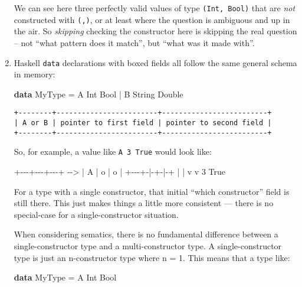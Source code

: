 \documentclass[]{article}
\newenvironment{Shaded}{}{}
\newcommand{\DataTypeTok}[1]{\textcolor[rgb]{0.56,0.13,0.00}{#1}}
\newcommand{\DecValTok}[1]{\textcolor[rgb]{0.25,0.63,0.44}{#1}}
\newcommand{\KeywordTok}[1]{\textcolor[rgb]{0.00,0.44,0.13}{\textbf{#1}}}
\newcommand{\NormalTok}[1]{#1}
\newcommand{\OperatorTok}[1]{\textcolor[rgb]{0.40,0.40,0.40}{#1}}
\newcommand{\OtherTok}[1]{\textcolor[rgb]{0.00,0.44,0.13}{#1}}
\begin{document}
\begin{enumerate}
  We can see here three perfectly valid values of type \texttt{(Int,\ Bool)}
  that are \emph{not} constructed with \texttt{(,)}, or at least where the
  question is ambiguous and up in the air. So \emph{skipping} checking the
  constructor here is skipping the real question -- not ``what pattern does it
  match'', but ``what was it made with''.
\item
  Haskell \texttt{data} declarations with boxed fields all follow the same
  general schema in memory:

\begin{Shaded}
\begin{Highlighting}[]
\KeywordTok{data} \DataTypeTok{MyType} \OtherTok{=} \DataTypeTok{A} \DataTypeTok{Int} \DataTypeTok{Bool}
            \OperatorTok{|} \DataTypeTok{B} \DataTypeTok{String} \DataTypeTok{Double}
\end{Highlighting}
\end{Shaded}

\begin{verbatim}
+--------+------------------------+-------------------------+
| A or B | pointer to first field | pointer to second field |
+--------+------------------------+-------------------------+
\end{verbatim}

  So, for example, a value like \texttt{A\ 3\ True} would look like:

\begin{Shaded}
\begin{Highlighting}[]
    \OperatorTok{+{-}{-}{-}+{-}{-}{-}+{-}{-}{-}+}
\OperatorTok{{-}{-}\textgreater{}} \OperatorTok{|} \DataTypeTok{A} \OperatorTok{|}\NormalTok{ o }\OperatorTok{|}\NormalTok{ o }\OperatorTok{|}
    \OperatorTok{+{-}{-}{-}+{-}|{-}+{-}|{-}+}
      \OperatorTok{|}   \OperatorTok{|}
\NormalTok{      v   v}
      \DecValTok{3}   \DataTypeTok{True}
\end{Highlighting}
\end{Shaded}

  For a type with a single constructor, that initial ``which constructor'' field
  is still there. This just makes things a little more consistent --- there is
  no special-case for a single-constructor situation.

  When considering sematics, there is no fundamental difference between a
  single-constructor type and a multi-constructor type. A single-constructor
  type is just an n-constructor type where n = 1. This means that a type like:

\begin{Shaded}
\begin{Highlighting}[]
\KeywordTok{data} \DataTypeTok{MyType} \OtherTok{=} \DataTypeTok{A} \DataTypeTok{Int} \DataTypeTok{Bool}
\end{Highlighting}
\end{Shaded}


\end{enumerate}
\end{document}
